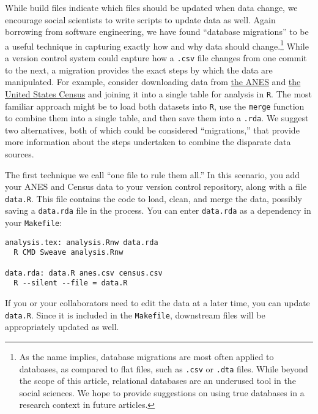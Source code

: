 \documentclass[]{article}
\begin{document}
While build files indicate which files should be updated when data change, we
encourage social scientists to write scripts to update data as well. Again
borrowing from software engineering, we have found ``database migrations'' to
be a useful technique in capturing exactly how and why data should
change.\footnote{As the name implies, database migrations are most often
applied to databases, as compared to flat files, such as \texttt{.csv} or
\texttt{.dta} files. While beyond the scope of this article, relational databases are an
underused tool in the social sciences. We hope to provide suggestions on using
true databases in a research context in future articles.}
While a version control system could capture how a \texttt{.csv} file changes
from one commit to the next, a migration provides the exact steps by which the
data are manipulated. For example, consider downloading data from \href{http://electionstudies.org}{the
ANES} and \href{http://www.census.gov}{the United States
Census} and joining it into a single table for analysis
in \texttt{R}. The most familiar approach might be to load both datasets into
\texttt{R}, use the \texttt{merge} function to combine them into a single
table, and then save them into a \texttt{.rda}. We suggest two alternatives,
both of which could be considered ``migrations,'' that provide more
information about the steps undertaken to combine the disparate data sources.

The first technique we call ``one file to rule them all.'' In this scenario,
you add your ANES and Census data to your version control repository, along
with a file \texttt{data.R}. This file contains the code to load, clean, and
merge the data, possibly saving a \texttt{data.rda} file in the process. You can
enter \texttt{data.rda} as a dependency in your \texttt{Makefile}:

\begin{verbatim}
analysis.tex: analysis.Rnw data.rda
  R CMD Sweave analysis.Rnw

data.rda: data.R anes.csv census.csv
  R --silent --file = data.R
\end{verbatim}

If you or your collaborators need to edit the data at a later time, you can
update \texttt{data.R}. Since it is included in the \texttt{Makefile},
downstream files will be appropriately updated as well.
\end{document}
